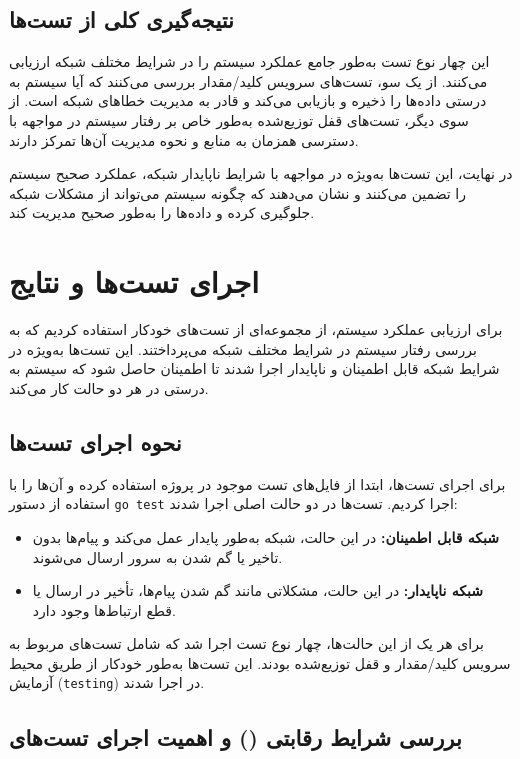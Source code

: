 \subsection*{نتیجه‌گیری کلی از تست‌ها}

این چهار نوع تست به‌طور جامع عملکرد سیستم را در شرایط مختلف شبکه ارزیابی می‌کنند. از یک سو، تست‌های سرویس کلید/مقدار بررسی می‌کنند که آیا سیستم به درستی داده‌ها را ذخیره و بازیابی می‌کند و قادر به مدیریت خطاهای شبکه است. از سوی دیگر، تست‌های قفل توزیع‌شده به‌طور خاص بر رفتار سیستم در مواجهه با دسترسی همزمان به منابع و نحوه مدیریت آن‌ها تمرکز دارند.

در نهایت، این تست‌ها به‌ویژه در مواجهه با شرایط ناپایدار شبکه، عملکرد صحیح سیستم را تضمین می‌کنند و نشان می‌دهند که چگونه سیستم می‌تواند از مشکلات شبکه جلوگیری کرده و داده‌ها را به‌طور صحیح مدیریت کند.

\section*{اجرای تست‌ها و نتایج}

برای ارزیابی عملکرد سیستم، از مجموعه‌ای از تست‌های خودکار استفاده کردیم که به بررسی رفتار سیستم در شرایط مختلف شبکه می‌پرداختند. این تست‌ها به‌ویژه در شرایط شبکه قابل اطمینان و ناپایدار اجرا شدند تا اطمینان حاصل شود که سیستم به درستی در هر دو حالت کار می‌کند.

\subsection*{نحوه اجرای تست‌ها}

برای اجرای تست‌ها، ابتدا از فایل‌های تست موجود در پروژه استفاده کرده و آن‌ها را با استفاده از دستور \texttt{go test} اجرا کردیم. تست‌ها در دو حالت اصلی اجرا شدند:
\begin{itemize}
    \item \textbf{شبکه قابل اطمینان:} در این حالت، شبکه به‌طور پایدار عمل می‌کند و پیام‌ها بدون تاخیر یا گم شدن به سرور ارسال می‌شوند.
    \item \textbf{شبکه ناپایدار:} در این حالت، مشکلاتی مانند گم شدن پیام‌ها، تأخیر در ارسال یا قطع ارتباط‌ها وجود دارد.
\end{itemize}

برای هر یک از این حالت‌ها، چهار نوع تست اجرا شد که شامل تست‌های مربوط به سرویس کلید/مقدار و قفل توزیع‌شده بودند. این تست‌ها به‌طور خودکار از طریق محیط آزمایش (\texttt{testing}) در اجرا شدند. 

\subsection*{بررسی شرایط رقابتی () و اهمیت اجرای تست‌های }

